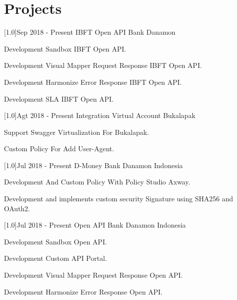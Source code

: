 \documentclass[english]{cv-style}
\begin{document}
\section{Projects}
\vspace{-0.3cm}
\begin{entrylist}
\entry
{\scalebox{.6}[1.0]{Sep 2018 - Present}}
{IBFT Open API Bank Danamon}
{}
{\vspace{-0.3cm}
  \begin{itemize}\small{
    \item Development Sandbox IBFT Open API.
    \item Development Visual Mapper Request Response IBFT Open API.
    \item Development Harmonize Error Response IBFT Open API.
    \item Development SLA IBFT Open API.}
  \end{itemize}}
\entry
{\scalebox{.6}[1.0]{Agt 2018 - Present}}
{Integration Virtual Account Bukalapak}
{}
{\vspace{-0.3cm}
  \begin{itemize}\small{
    \item Support Swagger Virtualization For Bukalapak.
    \item Custom Policy For Add User-Agent.}
  \end{itemize}}
\entry
{\scalebox{.6}[1.0]{Jul 2018 - Present}}
{D-Money Bank Danamon Indonesia}
{}
{\vspace{-0.3cm}
  \begin{itemize}\small{
    \item Development And Custom Policy With Policy Studio Axway.
    \item Development and implements custom security Signature using SHA256 and OAuth2.}
  \end{itemize}}
\entry
{\scalebox{.6}[1.0]{Jul 2018 - Present}}
{Open API Bank Danamon Indonesia}
{}
{\vspace{-0.3cm}
  \begin{itemize}\small{
    \item Development Sandbox Open API.
    \item Development Custom API Portal.
    \item Development Visual Mapper Request Response Open API.
    \item Development Harmonize Error Response Open API.
}
\end{itemize}}
\end{entrylist}
\end{document}
